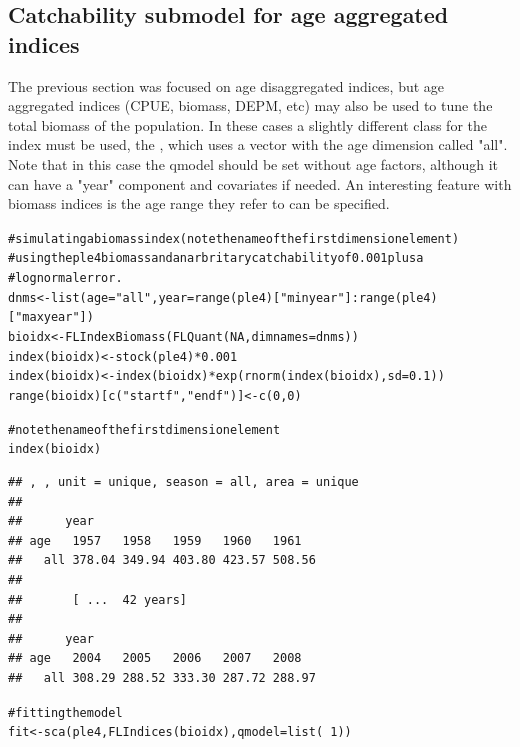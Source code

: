 \documentclass[a4paper,english,10pt]{article}\usepackage[]{graphicx}\usepackage[]{color}
\makeatletter
\newcommand{\hlnum}[1]{\textcolor[rgb]{0.063,0.58,0.627}{#1}}%
\newcommand{\hlstr}[1]{\textcolor[rgb]{0.063,0.58,0.627}{#1}}%
\newcommand{\hlcom}[1]{\textcolor[rgb]{0.588,0.588,0.588}{#1}}%
\newcommand{\hlopt}[1]{\textcolor[rgb]{0.196,0.196,0.196}{#1}}%
\newcommand{\hlstd}[1]{\textcolor[rgb]{0.196,0.196,0.196}{#1}}%
\newcommand{\hlkwb}[1]{\textcolor[rgb]{0.627,0,0.314}{#1}}%
\newcommand{\hlkwc}[1]{\textcolor[rgb]{0,0.631,0.314}{#1}}%
\newcommand{\hlkwd}[1]{\textcolor[rgb]{0.78,0.227,0.412}{#1}}%
\newenvironment{kframe}{%
 \def\at@end@of@kframe{}%
 \ifinner\ifhmode%
  \def\at@end@of@kframe{\end{minipage}}%
  \begin{minipage}{\columnwidth}%
 \fi\fi%
 \def\FrameCommand##1{\hskip\@totalleftmargin \hskip-\fboxsep
 \colorbox{shadecolor}{##1}\hskip-\fboxsep
     \hskip-\linewidth \hskip-\@totalleftmargin \hskip\columnwidth}%
 \MakeFramed {\advance\hsize-\width
   \@totalleftmargin\z@ \linewidth\hsize
   \@setminipage}}%
 {\par\unskip\endMakeFramed%
 \at@end@of@kframe}
\newenvironment{knitrout}{}{} %
\makeatother
\begin{document}
\subsection{Catchability submodel for age aggregated indices}

The previous section was focused on age disaggregated indices, but age aggregated indices (CPUE, biomass, DEPM, etc) may also be used to tune the total biomass of the population. In these cases a slightly different class for the index must be used, the , which uses a vector  with the age dimension called "all". Note that in this case the qmodel should be set without age factors, although it can have a "year" component and covariates if needed. An interesting feature with biomass indices is the age range they refer to can be specified.

\begin{knitrout}
\color{fgcolor}\begin{kframe}
\begin{alltt}
\hlcom{# simulating a biomass index (note the name of the first dimension element)}
\hlcom{# using the ple4 biomass and an arbritary catchability of 0.001 plus a}
\hlcom{# lognormal error.}
\hlstd{dnms} \hlkwb{<-} \hlkwd{list}\hlstd{(}\hlkwc{age} \hlstd{=} \hlstr{"all"}\hlstd{,} \hlkwc{year} \hlstd{=} \hlkwd{range}\hlstd{(ple4)[}\hlstr{"minyear"}\hlstd{]}\hlopt{:}\hlkwd{range}\hlstd{(ple4)[}\hlstr{"maxyear"}\hlstd{])}
\hlstd{bioidx} \hlkwb{<-} \hlkwd{FLIndexBiomass}\hlstd{(}\hlkwd{FLQuant}\hlstd{(}\hlnum{NA}\hlstd{,} \hlkwc{dimnames} \hlstd{= dnms))}
\hlkwd{index}\hlstd{(bioidx)} \hlkwb{<-} \hlkwd{stock}\hlstd{(ple4)} \hlopt{*} \hlnum{0.001}
\hlkwd{index}\hlstd{(bioidx)} \hlkwb{<-} \hlkwd{index}\hlstd{(bioidx)} \hlopt{*} \hlkwd{exp}\hlstd{(}\hlkwd{rnorm}\hlstd{(}\hlkwd{index}\hlstd{(bioidx),} \hlkwc{sd} \hlstd{=} \hlnum{0.1}\hlstd{))}
\hlkwd{range}\hlstd{(bioidx)[}\hlkwd{c}\hlstd{(}\hlstr{"startf"}\hlstd{,} \hlstr{"endf"}\hlstd{)]} \hlkwb{<-} \hlkwd{c}\hlstd{(}\hlnum{0}\hlstd{,} \hlnum{0}\hlstd{)}

\hlcom{# note the name of the first dimension element}
\hlkwd{index}\hlstd{(bioidx)}
\end{alltt}
\begin{verbatim}
## , , unit = unique, season = all, area = unique
## 
##      year
## age   1957   1958   1959   1960   1961  
##   all 378.04 349.94 403.80 423.57 508.56
## 
##       [ ...  42 years]
## 
##      year
## age   2004   2005   2006   2007   2008  
##   all 308.29 288.52 333.30 287.72 288.97
\end{verbatim}
\begin{alltt}
\hlcom{# fitting the model}
\hlstd{fit} \hlkwb{<-} \hlkwd{sca}\hlstd{(ple4,} \hlkwd{FLIndices}\hlstd{(bioidx),} \hlkwc{qmodel} \hlstd{=} \hlkwd{list}\hlstd{(}\hlopt{~}\hlnum{1}\hlstd{))}
\end{alltt}
\end{kframe}
\end{knitrout}
\end{document}
